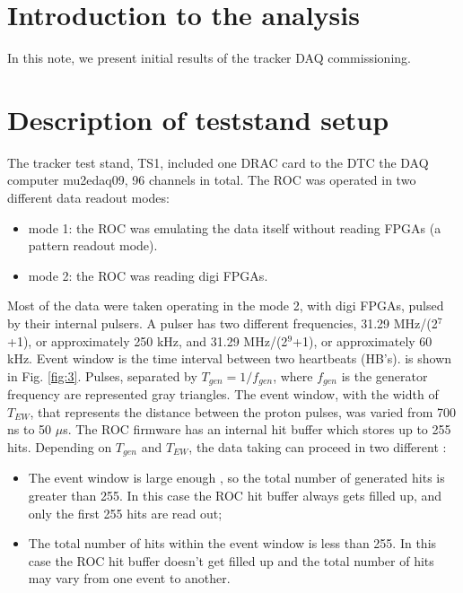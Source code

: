 \section {Introduction to the analysis}

In this note, we present initial results of the tracker DAQ commissioning.
\section{Description of teststand setup}
The tracker test stand,  TS1, included one DRAC card 
to the DTC   the DAQ computer mu2edaq09, 96 channels in total.
The ROC was operated in two different data readout modes:
\begin{itemize}
\item 
  mode 1: the ROC was emulating the data itself without reading FPGAs (a pattern readout mode).
\item 
  mode 2: the ROC was reading digi FPGAs.
\end{itemize}

Most of the data were taken operating in the mode 2, with digi FPGAs, pulsed by their internal pulsers.
A pulser has two different frequencies,  31.29 MHz/(2$^7$+1), or approximately 250 kHz, 
and 31.29 MHz/(2$^9$+1), or approximately 60 kHz.
Event window is the time interval between two heartbeats (HB's). 
 is shown in Fig. \ref{fig:3}.
Pulses, separated by $T_{gen}=1/f_{gen}$, where $f_{gen}$ is  the generator frequency
are represented  gray triangles.
The event window, with the width of $T_{EW}$, that represents the distance between the proton pulses, 
was varied from 700 ns to 50 $\mu$s. 
The ROC firmware has an internal hit buffer which stores up to 255 hits.
Depending on $T_{gen}$ and $T_{EW}$, the data taking can proceed in two different
:
\begin{itemize}
\item
  The event window is large enough , so the total number of generated hits is greater than 255. In this case
  the ROC hit buffer always gets filled up, and only the first 255 hits are read out;
\item
  The total number of hits within the event window is less than 255.
  In this case the ROC hit buffer doesn't get filled up and the total number of hits may vary from one event to another.
\end{itemize}

